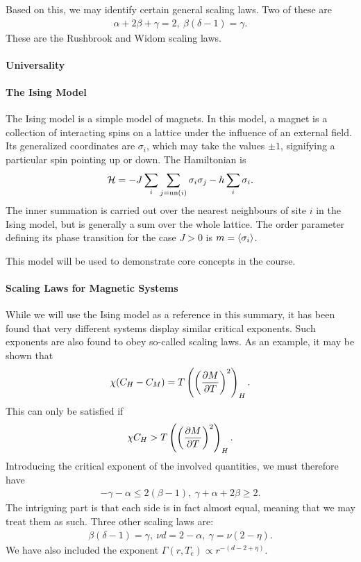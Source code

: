 Based on this, we may identify certain general scaling laws. Two of these are
\begin{align*}
	\alpha + 2\beta + \gamma = 2,\ \beta(\delta - 1) = \gamma.
\end{align*}
These are the Rushbrook and Widom scaling laws.


\paragraph{Universality}

\paragraph{The Ising Model}
The Ising model is a simple model of magnets. In this model, a magnet is a collection of interacting spins on a lattice under the influence of an external field. Its generalized coordinates are $\sigma_{i}$, which may take the values $\pm 1$, signifying a particular spin pointing up or down. The Hamiltonian is
\begin{align*}
	\mathcal{H} = -J\sum\limits_{i}\sum\limits_{j = \text{nn}(i)}\sigma_{i}\sigma_{j} - h\sum\limits_{i}\sigma_{i}.
\end{align*}
The inner summation is carried out over the nearest neighbours of site $i$ in the Ising model, but is generally a sum over the whole lattice. The order parameter defining its phase transition for the case $J > 0$ is $m = \expval{\sigma_{i}}$.

This model will be used to demonstrate core concepts in the course.

\paragraph{Scaling Laws for Magnetic Systems}
While we will use the Ising model as a reference in this summary, it has been found that very different systems display similar critical exponents. Such exponents are also found to obey so-called scaling laws. As an example, it may be shown that
\begin{align*}
	\chi(C_{H} - C_{M}) = T\left(\left(\pdv{M}{T}\right)^{2}\right)_{H}.
\end{align*}
This can only be satisfied if
\begin{align*}
	\chi C_{H} > T\left(\left(\pdv{M}{T}\right)^{2}\right)_{H}.
\end{align*}
Introducing the critical exponent of the involved quantities, we must therefore have
\begin{align*}
	-\gamma - \alpha \leq 2(\beta - 1),\ \gamma + \alpha + 2\beta \geq 2.
\end{align*}
The intriguing part is that each side is in fact almost equal, meaning that we may treat them as such. Three other scaling laws are:
\begin{align*}
	\beta(\delta - 1) = \gamma,\ \nu d = 2 - \alpha,\ \gamma = \nu(2 - \eta).
\end{align*}
We have also included the exponent $\Gamma(r, T_{\text{c}}) \propto r^{-(d - 2 + \eta)}$.

